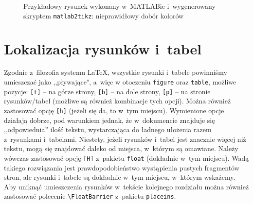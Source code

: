 \begin{figure}[H]
\centering
	
\caption{Przykładowy rysunek wykonany w~MATLABie i~wygenerowany skryptem \texttt{matlab2tikz}: nieprawidłowy dobór kolorów}
\label{r_wykres_kolory2}
\end{figure}

\section{Lokalizacja rysunków i~tabel}
Zgodnie z~filozofia systemu \LaTeX, wszystkie rysunki i~tabele powinniśmy umieszczać jako ,,pływające", a~więc w otoczeniu \verb+figure+ oraz \verb+table+, możliwe pozycje: \verb+[t]+ -- na górze strony, \verb+[b]+ -- na dole strony, \verb+[p]+ -- na stronie rysunków/tabel (możliwe są również kombinacje tych opcji). Można również zastosować opcję \verb+[h]+ (jeżeli się da, to w~tym miejscu). Wymienione opcje działają dobrze, pod warunkiem jednak, że w~dokumencie znajduje się ,,odpowiednia'' ilość tekstu, wystarczająca do ładnego ułożenia razem z~rysunkami i~tabelami. Niestety, jeżeli rysunków i~tabel jest znacznie więcej niż tekstu, mogą się znajdować daleko od miejsca, w~którym są omawiane. Należy wówczas zastosować opcję \verb+[H]+ z~pakietu \verb+float+ (dokładnie w~tym miejscu). Wadą takiego rozwiązania jest prawdopodobieństwo wystąpienia pustych fragmentów stron, ale rysunki i~tabele są dokładnie w~tym miejscu, w~którym wskażemy. Aby uniknąć umieszczenia rysunków w~tekście kolejnego rozdziału można również zastosować polecenie \verb+\FloatBarrier+ z~pakietu \verb+placeins+.


